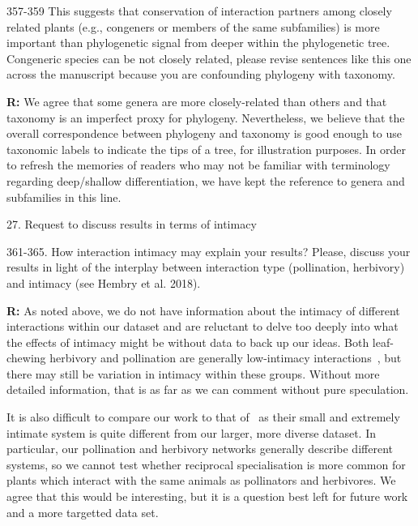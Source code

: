 \documentclass[12pt]{letter}
\newenvironment{refquote}{\bigskip \begin{it}}{\end{it}\smallskip}
\begin{document}
		\begin{refquote}
			357-359 This suggests that conservation of interaction partners among closely related plants (e.g., congeners or members of the same subfamilies) is more important than phylogenetic signal from deeper within the phylogenetic tree. Congeneric species can be not closely related, please revise sentences like this one across the manuscript because you are confounding phylogeny with taxonomy.
		\end{refquote}


		\textbf{R:} We agree that some genera are more closely-related than others and that taxonomy is an imperfect proxy for phylogeny. Nevertheless, we believe that the overall correspondence between phylogeny and taxonomy is good enough to use taxonomic labels to indicate the tips of a tree, for illustration purposes. In order to refresh the memories of readers who may not be familiar with terminology regarding deep/shallow differentiation, we have kept the reference to genera and subfamilies in this line.



	27. Request to discuss results in terms of intimacy 

		\begin{refquote}
			361-365. How interaction intimacy may explain your results? Please, discuss your results in light of the interplay between interaction type (pollination, herbivory) and intimacy (see Hembry et al. 2018).
		\end{refquote}


		\textbf{R:} As noted above, we do not have information about the intimacy of different interactions within our dataset and are reluctant to delve too deeply into what the effects of intimacy might be without data to back up our ideas. Both leaf-chewing herbivory and pollination are generally low-intimacy interactions~\citep{Astegiano2017}, but there may still be variation in intimacy within these groups. Without more detailed information, that is as far as we can comment without pure speculation. 


		It is also difficult to compare our work to that of~\citet{Hembry2018} as their small and extremely intimate system is quite different from our larger, more diverse dataset. In particular, our pollination and herbivory networks generally describe different systems, so we cannot test whether reciprocal specialisation is more common for plants which interact with the same animals as pollinators and herbivores. We agree that this would be interesting, but it is a question best left for future work and a more targetted data set.
\end{document}
